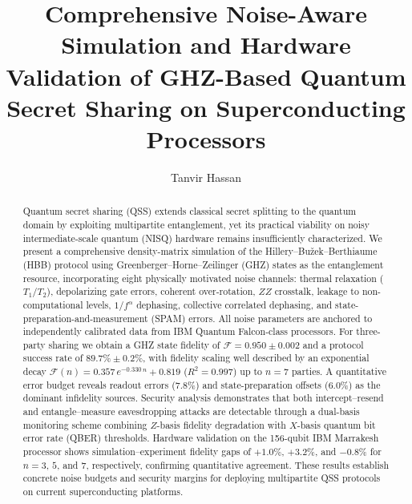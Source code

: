 \documentclass[aip, amsmath, amssymb, preprint, longbibliography]{revtex4-2}
\begin{document}
\title{Comprehensive Noise-Aware Simulation and Hardware Validation of
GHZ-Based Quantum Secret Sharing on Superconducting Processors}

\author{Tanvir Hassan}


\begin{abstract}
Quantum secret sharing (QSS) extends classical secret splitting to the
quantum domain by exploiting multipartite entanglement, yet its practical
viability on noisy intermediate-scale quantum (NISQ) hardware remains
insufficiently characterized. We present a comprehensive density-matrix
simulation of the Hillery--Bu\v{z}ek--Berthiaume (HBB) protocol using
Greenberger--Horne--Zeilinger (GHZ) states as the entanglement resource,
incorporating eight physically motivated noise channels:
thermal relaxation ($T_1/T_2$), depolarizing gate errors, coherent
over-rotation, $ZZ$ crosstalk, leakage to non-computational levels,
$1/f^\alpha$ dephasing, collective correlated dephasing, and
state-preparation-and-measurement (SPAM) errors. All noise parameters are
anchored to independently calibrated data from IBM Quantum Falcon-class
processors. For three-party sharing we obtain a GHZ state fidelity of
$\mathcal{F}=0.950\pm0.002$ and a protocol success rate of
$89.7\%\pm0.2\%$, with fidelity scaling well described by an exponential
decay $\mathcal{F}(n)=0.357\,e^{-0.330\,n}+0.819$ ($R^2=0.997$) up to
$n=7$ parties. A quantitative error budget reveals readout errors
($7.8\%$) and state-preparation offsets ($6.0\%$) as the dominant
infidelity sources. Security analysis demonstrates that both
intercept--resend and entangle--measure eavesdropping attacks are
detectable through a dual-basis monitoring scheme combining $Z$-basis
fidelity degradation with $X$-basis quantum bit error rate (QBER)
thresholds. Hardware validation on the 156-qubit IBM Marrakesh processor
shows simulation--experiment fidelity gaps of $+1.0\%$, $+3.2\%$, and
$-0.8\%$ for $n=3$, $5$, and $7$, respectively, confirming quantitative
agreement. These results establish concrete noise budgets and security
margins for deploying multipartite QSS protocols on current
superconducting platforms.
\end{abstract}

\end{document}
